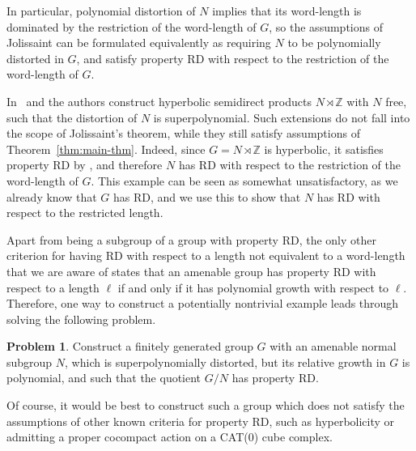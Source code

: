 \documentclass{amsart}
\theoremstyle{definition}
\newtheorem*{problem}{Problem}
\theoremstyle{remark}
\begin{document}
In particular, polynomial distortion of $N$ implies that its
word-length is dominated by the restriction of the word-length of $G$,
so the assumptions of Jolissaint can be formulated equivalently as
requiring $N$ to be polynomially distorted in $G$, and satisfy
property RD with respect to the restriction of the word-length of $G$.

In~\cite{Brady2013} and \cite{Brinkmann2000} the authors construct
hyperbolic semidirect products $N\rtimes {\mathbb{Z}}$ with $N$ free, such that
the distortion of $N$ is superpolynomial. Such extensions do not fall
into the scope of Jolissaint's theorem, while they still satisfy
assumptions of Theorem~\ref{thm:main-thm}. Indeed, since
$G=N\rtimes{\mathbb{Z}}$ is hyperbolic, it satisfies property RD by
\cite{MR972078}, and therefore $N$ has RD with respect to the
restriction of the word-length of $G$. This example can be seen as
somewhat unsatisfactory, as we already know that $G$ has RD, and we
use this to show that $N$ has RD with respect to the restricted
length.

Apart from being a subgroup of a group with property RD, the only
other criterion for having RD with respect to a length not equivalent
to a word-length that we are aware of states that an amenable group
has property RD with respect to a length $\ell$ if and only if it has
polynomial growth with respect to $\ell$. Therefore, one way to
construct a potentially nontrivial example leads through solving the
following problem.

\begin{problem}
  Construct a finitely generated group $G$ with an amenable normal
  subgroup $N$, which is superpolynomially distorted, but its relative
  growth in $G$ is polynomial, and such that the quotient $G/N$ has
  property RD.
\end{problem}
 
Of course, it would be best to construct such a group which does not
satisfy the assumptions of other known criteria for property RD, such
as hyperbolicity or admitting a proper cocompact action on a CAT(0)
cube complex.



\end{document}
